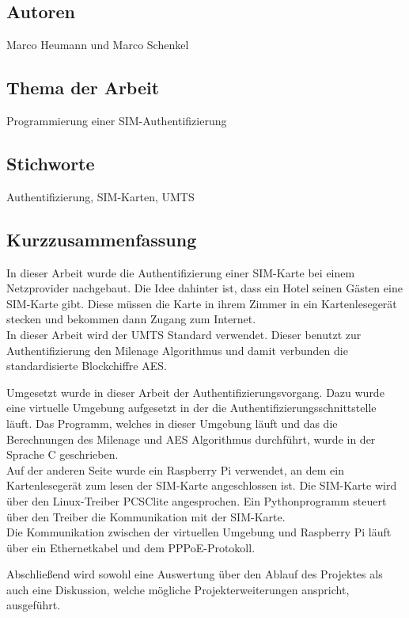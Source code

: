 \subsection*{Autoren}
\begin{addmargin}[1em]{2em}
Marco Heumann und Marco Schenkel
\end{addmargin}

\subsection*{Thema der Arbeit}
\begin{addmargin}[1em]{2em}
Programmierung einer SIM-Authentifizierung
\end{addmargin}

\subsection*{Stichworte}
\begin{addmargin}[1em]{2em}
Authentifizierung, SIM-Karten, UMTS
\end{addmargin}

\subsection*{Kurzzusammenfassung}
\begin{addmargin}[1em]{2em}
In dieser Arbeit wurde die Authentifizierung einer SIM-Karte
bei einem Netzprovider nachgebaut. Die Idee dahinter ist, dass
ein Hotel seinen Gästen eine SIM-Karte gibt. Diese müssen die
Karte in ihrem Zimmer in ein Kartenlesegerät stecken und bekommen
dann Zugang zum Internet. \\
In dieser Arbeit wird der UMTS Standard verwendet. Dieser benutzt
zur Authentifizierung den Milenage Algorithmus und damit verbunden
die standardisierte Blockchiffre AES.

Umgesetzt wurde in dieser Arbeit der Authentifizierungsvorgang. Dazu
wurde eine virtuelle Umgebung aufgesetzt in der die Authentifizierungsschnittstelle
läuft. Das Programm, welches in dieser Umgebung läuft und das die Berechnungen
des Milenage und AES Algorithmus durchführt, wurde in der Sprache C
geschrieben. \\
Auf der anderen Seite wurde ein Raspberry Pi verwendet, an dem ein Kartenlesegerät zum lesen der SIM-Karte
angeschlossen ist. Die SIM-Karte wird über den Linux-Treiber
PCSClite angesprochen. Ein Pythonprogramm steuert über den Treiber die Kommunikation
mit der SIM-Karte. \\
Die Kommunikation zwischen der virtuellen Umgebung und Raspberry Pi läuft über
ein Ethernetkabel und dem PPPoE-Protokoll.

Abschließend wird sowohl eine Auswertung über den Ablauf des Projektes als auch
eine Diskussion, welche mögliche Projekterweiterungen anspricht, ausgeführt.
\end{addmargin}